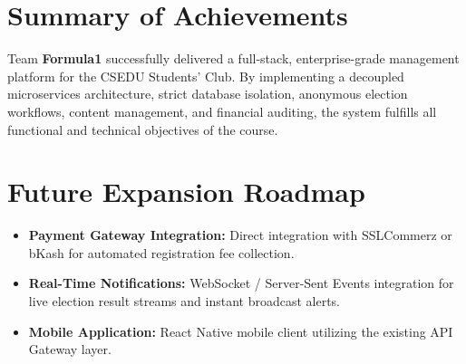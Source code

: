 \documentclass[12pt, a4paper]{report}
\begin{document}
\section{Summary of Achievements}
Team \textbf{Formula1} successfully delivered a full-stack, enterprise-grade management platform for the CSEDU Students' Club. By implementing a decoupled microservices architecture, strict database isolation, anonymous election workflows, content management, and financial auditing, the system fulfills all functional and technical objectives of the course.

\section{Future Expansion Roadmap}
\begin{itemize}
    \item \textbf{Payment Gateway Integration:} Direct integration with SSLCommerz or bKash for automated registration fee collection.
    \item \textbf{Real-Time Notifications:} WebSocket / Server-Sent Events integration for live election result streams and instant broadcast alerts.
    \item \textbf{Mobile Application:} React Native mobile client utilizing the existing API Gateway layer.
\end{itemize}
\end{document}
